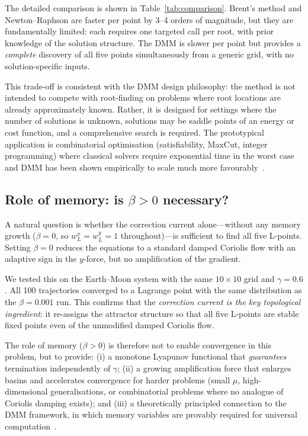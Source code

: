 \documentclass[10pt,twocolumn]{article}
\begin{document}
The detailed comparison is shown in Table~\ref{tab:comparison}.
Brent's method and Newton--Raphson are faster per point by 3--4 orders of
magnitude, but they are fundamentally limited: each requires one targeted
call per root, with prior knowledge of the solution structure.
The DMM is slower per point but provides a \emph{complete} discovery of all
five points simultaneously from a generic grid, with no solution-specific
inputs.

This trade-off is consistent with the DMM design philosophy: the method is not
intended to compete with root-finding on problems where root locations are
already approximately known.
Rather, it is designed for settings where the number of solutions is unknown,
solutions may be saddle points of an energy or cost function, and a
comprehensive search is required.
The prototypical application is combinatorial optimisation
(satisfiability, MaxCut, integer programming) where classical
solvers require exponential time in the worst case and DMM has been shown
empirically to scale much more favourably~\cite{traversa2019}.

\subsection{Role of memory: is \texorpdfstring{$\beta>0$}{β > 0} necessary?}

A natural question is whether the correction current alone---without any memory
growth ($\beta=0$, so $w_L^x=w_L^y=1$ throughout)---is sufficient to find all
five L-points.
Setting $\beta=0$ reduces the equations to a standard damped Coriolis flow
with an adaptive sign in the $y$-force, but no amplification of the gradient.

We tested this on the Earth--Moon system with the same $10\times10$ grid and
$\gamma=0.6$.
All 100 trajectories converged to a Lagrange point with the same distribution
as the $\beta=0.001$ run.
This confirms that the \emph{correction current is the key topological
ingredient}: it re-assigns the attractor structure so that all five L-points
are stable fixed points even of the unmodified damped Coriolis flow.

The role of memory ($\beta>0$) is therefore not to enable convergence in this
problem, but to provide: (i) a monotone Lyapunov functional that
\emph{guarantees} termination independently of $\gamma$; (ii) a growing
amplification force that enlarges basins and accelerates convergence for
harder problems (small $\mu$, high-dimensional generalisations, or
combinatorial problems where no analogue of Coriolis damping exists); and
(iii) a theoretically principled connection to the DMM framework, in which
memory variables are provably required for universal
computation~\cite{traversa2015}.
\end{document}

